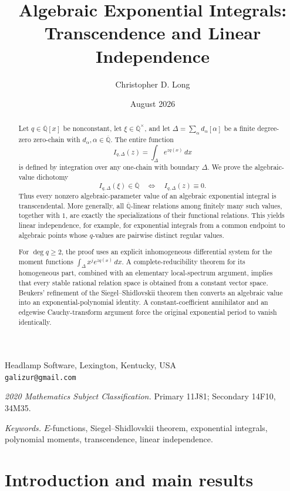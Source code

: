 \documentclass[11pt]{article}
\title{Algebraic Exponential Integrals:\\
Transcendence and Linear Independence}
\author{Christopher D. Long}
\date{August 2026}
\numberwithin{equation}{section}
\theoremstyle{definition}
\theoremstyle{remark}
\newcommand{\Qbar}{\overline{\mathbb Q}}
\begin{document}
\maketitle

\begin{center}
\small
Headlamp Software, Lexington, Kentucky, USA\\
\texttt{galizur@gmail.com}
\end{center}

\begin{abstract}
Let $q\in\Qbar[x]$ be nonconstant, let $\xi\in\Qbar^\times$, and let
$\Delta=\sum_\alpha d_\alpha[\alpha]$ be a finite degree-zero zero-chain with
$d_\alpha,\alpha\in\Qbar$.  The entire function
\[
  I_{q,\Delta}(z)=\int_\Delta e^{zq(x)}\,dx
\]
is defined by integration over any one-chain with boundary $\Delta$.  We prove
the algebraic-value dichotomy
\[
  I_{q,\Delta}(\xi)\in\Qbar
  \quad\Longleftrightarrow\quad
  I_{q,\Delta}(z)\equiv0.
\]
Thus every nonzero algebraic-parameter value of an algebraic exponential
integral is transcendental.  More generally, all $\Qbar$-linear relations among
finitely many such values, together with $1$, are exactly the specializations
of their functional relations.  This yields linear independence, for example,
for exponential integrals from a common endpoint to algebraic points whose
$q$-values are pairwise distinct regular values.

For $\deg q\ge2$, the proof uses an explicit inhomogeneous differential system
for the moment functions
$\int_\Delta x^j e^{zq(x)}\,dx$.  A complete-reducibility theorem for its
homogeneous part, combined with an elementary local-spectrum argument, implies
that every stable rational relation space is obtained from a constant vector
space.  Beukers' refinement of the Siegel--Shidlovskii theorem then converts an
algebraic value into an exponential-polynomial identity.  A
constant-coefficient annihilator and an edgewise Cauchy-transform argument
force the original exponential period to vanish identically.
\end{abstract}

\medskip
\noindent\textit{2020 Mathematics Subject Classification.}
Primary 11J81; Secondary 14F10, 34M35.

\noindent\textit{Keywords.}
$E$-functions, Siegel--Shidlovskii theorem, exponential integrals,
polynomial moments, transcendence, linear independence.

\tableofcontents

\section{Introduction and main results}\label{sec:introduction}
\end{document}
